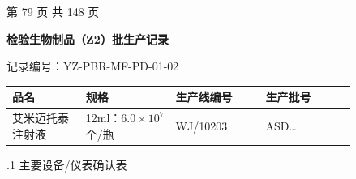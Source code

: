\documentclass[UTF8,10pt,a4paper,fontset=fandol]{ctexart}
\newcommand{\fieldvalue}[1]{#1}
\newcommand{\handwritten}[1]{#1}
\begin{document}
\begin{center}
第 79 页 共 148 页
\end{center}

\newpage

\noindent
\textbf{检验生物制品（Z2）批生产记录}

\medskip

\noindent
记录编号：YZ-PBR-MF-PD-01-02

\begin{tabular}{|p{0.18\linewidth}|p{0.22\linewidth}|p{0.22\linewidth}|p{0.22\linewidth}|}
\hline
品名 & 规格 & 生产线编号 & 生产批号\\
\hline
\fieldvalue{艾米迈托泰注射液} &
\fieldvalue{12ml：$6.0\times 10^{7}$个/瓶} &
\fieldvalue{\handwritten{WJ/10203}} &
\fieldvalue{\handwritten{ASD\ldots}}\\
\hline
\end{tabular}

\medskip

.1 主要设备/仪表确认表
\end{document}
